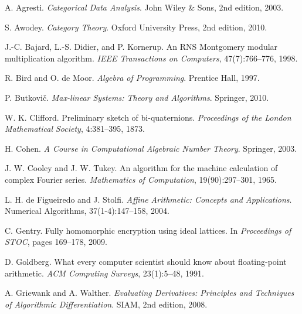 \documentclass[11pt]{article}
\theoremstyle{definition}
\begin{document}


\begin{thebibliography}{99}

A. Agresti.
\newblock \emph{Categorical Data Analysis}.
\newblock John Wiley \& Sons, 2nd edition, 2003.

S. Awodey.
\newblock \emph{Category Theory}.
\newblock Oxford University Press, 2nd edition, 2010.

J.-C. Bajard, L.-S. Didier, and P. Kornerup.
\newblock An {RNS} {Montgomery} modular multiplication algorithm.
\newblock \emph{IEEE Transactions on Computers}, 47(7):766--776, 1998.

R. Bird and O. de Moor.
\newblock \emph{Algebra of Programming}.
\newblock Prentice Hall, 1997.

P. Butkovi\v{c}.
\newblock \emph{Max-linear Systems: Theory and Algorithms}.
\newblock Springer, 2010.

W. K. Clifford.
\newblock Preliminary sketch of bi-quaternions.
\newblock \emph{Proceedings of the London Mathematical Society}, 4:381--395, 1873.

H. Cohen.
\newblock \emph{A Course in Computational Algebraic Number Theory}.
\newblock Springer, 2003.

J. W. Cooley and J. W. Tukey.
\newblock An algorithm for the machine calculation of complex {Fourier} series.
\newblock \emph{Mathematics of Computation}, 19(90):297--301, 1965.

L. H. de Figueiredo and J. Stolfi.
\newblock \emph{Affine Arithmetic: Concepts and Applications}.
\newblock Numerical Algorithms, 37(1-4):147--158, 2004.

C. Gentry.
\newblock Fully homomorphic encryption using ideal lattices.
\newblock In \emph{Proceedings of STOC}, pages 169--178, 2009.

D. Goldberg.
\newblock What every computer scientist should know about floating-point arithmetic.
\newblock \emph{ACM Computing Surveys}, 23(1):5--48, 1991.

A. Griewank and A. Walther.
\newblock \emph{Evaluating Derivatives: Principles and Techniques of Algorithmic Differentiation}.
\newblock SIAM, 2nd edition, 2008.


\end{thebibliography}
\end{document}
